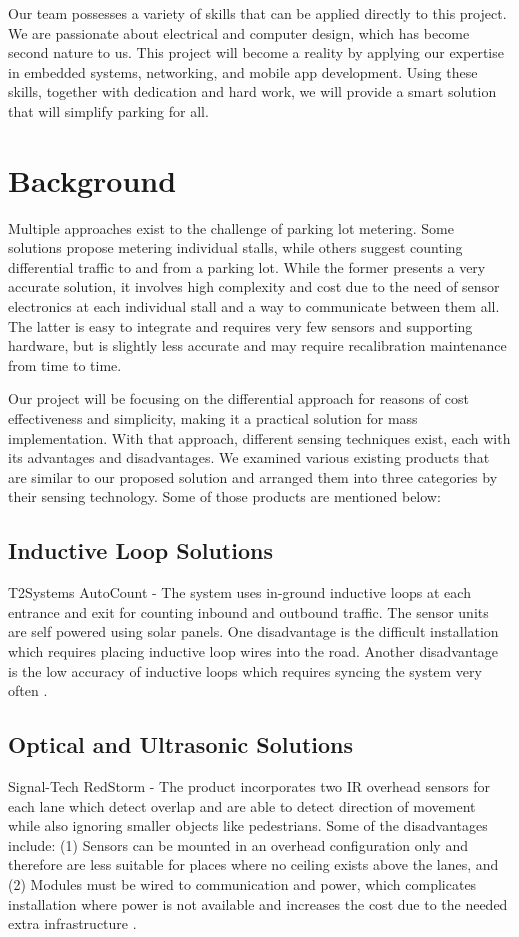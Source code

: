 \documentclass[letterpaper,10 pt,conference,onecolumn]{IEEEtran}
\begin{document}
		Our team possesses a variety of skills that can be applied directly to this project. We are passionate about electrical and computer design, which has become second nature to us. This project will become a reality by applying our expertise in embedded systems, networking, and mobile app development. Using these skills, together with dedication and hard work, we will provide a smart solution that will simplify parking for all.

	\section{Background}
		Multiple approaches exist to the challenge of parking lot metering. Some solutions propose metering individual stalls, while others suggest counting differential traffic to and from a parking lot. While the former presents a very accurate solution, it involves high complexity and cost due to the need of sensor electronics at each individual stall and a way to communicate between them all. The latter is easy to integrate and requires very few sensors and supporting hardware, but is slightly less accurate and may require recalibration maintenance from time to time.
		
		Our project will be focusing on the differential approach for reasons of cost effectiveness and simplicity, making it a practical solution for mass implementation. With that approach, different sensing techniques exist, each with its advantages and disadvantages. We examined various existing products that are similar to our proposed solution and arranged them into three categories by their sensing technology. Some of those products are mentioned below:
		
		\subsection{Inductive Loop Solutions}
			T2Systems AutoCount - The system uses in-ground inductive loops at each entrance and exit for counting inbound and outbound traffic. The sensor units are self powered using solar panels. One disadvantage is the difficult installation which requires placing inductive loop wires into the road. Another disadvantage is the low accuracy of inductive loops which requires syncing the system very often \cite{autocount}.
	
		\subsection{Optical and Ultrasonic Solutions}
			Signal-Tech RedStorm - The product incorporates two IR overhead sensors for each lane which detect overlap and are able to detect direction of movement while also ignoring smaller objects like pedestrians. Some of the disadvantages include: (1) Sensors can be mounted in an overhead configuration only and therefore are less suitable for places where no ceiling exists above the lanes, and (2) Modules must be wired to communication and power, which complicates installation where power is not available and increases the cost due to the needed extra infrastructure \cite{redstorm}.
		
\end{document}
